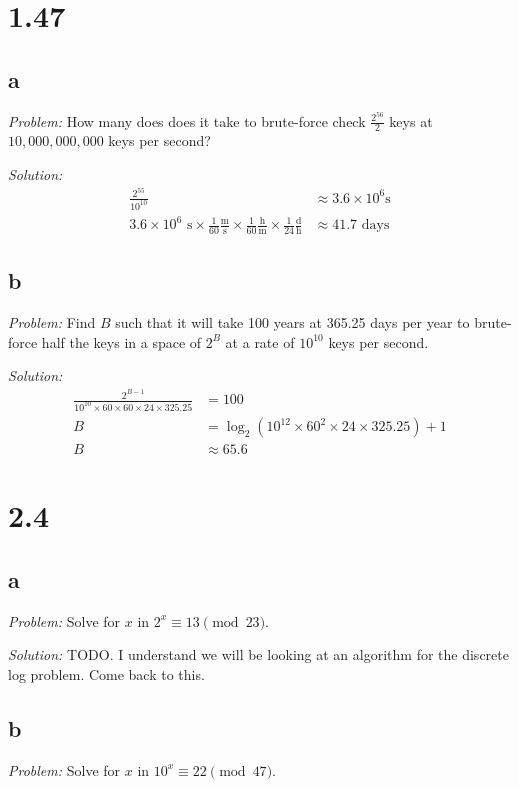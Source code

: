 \documentclass[12pt]{article}
\begin{document}
\section*{1.47}
\subsection*{a}
\textit{Problem:} How many does does it take to brute-force check $\frac{2^{56}}{2}$ keys at $10,000,000,000$ keys per second?

\textit{Solution:}
\begin{align*}
    \frac{2^{55}}{10^{10}} &\approx 3.6 \times 10^6 \text{s} \\
    3.6 \times 10^6 \text{ s} \times \frac{1}{60} \frac{\text{m}}{\text{s}} \times \frac{1}{60} \frac{\text{h}}{\text{m}} \times \frac{1}{24} \frac{\text{d}}{\text{h}} &\approx \boxed{41.7} \text{ days}
\end{align*}

\subsection*{b}
\textit{Problem:} Find $B$ such that it will take 100 years at 365.25 days per year to brute-force half the keys in a space of $2^B$ at a rate of $10^{10}$ keys per second.

\textit{Solution:}
\begin{align*}
    \frac{2^{B-1}}{10^{10} \times 60 \times 60 \times 24 \times 325.25} &= 100 \\
    B &= \log_2(10^{12} \times 60^2 \times 24 \times 325.25) + 1 \\
    B &\approx \boxed{65.6}
\end{align*}

\section*{2.4}
\subsection*{a}
\textit{Problem:} Solve for $x$ in $2^x \equiv 13 \pmod{23}$.

\textit{Solution:} TODO. I understand we will be looking at an algorithm for the discrete log problem. Come back to this.

\subsection*{b}
\textit{Problem:} Solve for $x$ in $10^x \equiv 22 \pmod{47}$.
\end{document}
